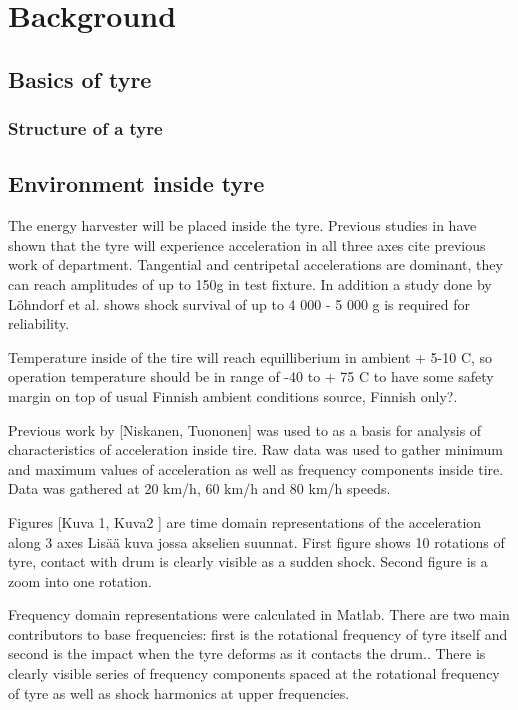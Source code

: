 \section{Background}

\subsection{Basics of tyre}
\subsubsection{Structure of a tyre}

\subsection{Environment inside tyre}
The energy harvester will be placed inside the tyre. Previous studies in have shown that the tyre will experience acceleration in all three axes {\color{red} cite previous work of department}. Tangential and centripetal accelerations are dominant, they can reach amplitudes of up to 150g in test fixture. In addition a study done by Löhndorf et al. \cite{Lohndorf2007} shows shock survival of up to 4 000 - 5 000 g is required for reliability. 

Temperature inside of the tire will reach equilliberium in ambient + 5-10 \degree C, so operation temperature should be in range of -40 to + 75 \degree C to have some safety margin on top of usual Finnish ambient conditions {\color{red} source, Finnish only?}.

Previous work by {\color{red}[Niskanen, Tuononen]} was used to as a basis for analysis of characteristics of acceleration inside tire. Raw data was used to gather minimum and maximum values of acceleration as well as frequency components inside tire. Data was gathered at 20 km/h, 60 km/h and 80 km/h speeds. 

Figures {\color{red}[Kuva 1, Kuva2 ]} are time domain representations of the acceleration along 3 axes {\color{red}Lis\"a\"a kuva jossa akselien suunnat}. First figure shows 10 rotations of tyre, contact with drum is clearly visible as a sudden shock. Second figure is a zoom into one rotation.

Frequency domain representations were calculated in Matlab. There are two main contributors to base frequencies: first is the rotational frequency of tyre itself and second is the impact when the tyre deforms as it contacts the drum.. There is clearly visible series of frequency components spaced at the rotational frequency of tyre as well as shock harmonics at upper frequencies. 

